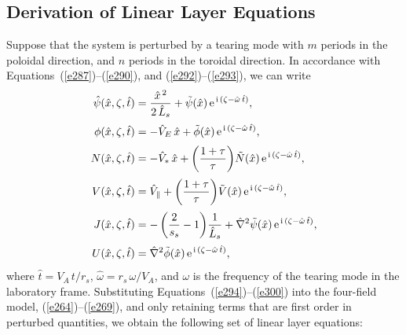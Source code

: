 \documentclass[notitlepage,12pt]{article}
\begin{document}
\subsection{Derivation of Linear Layer Equations}\label{s5.3}
Suppose that the system is perturbed by a tearing mode with $m$ periods in the poloidal direction, and
$n$ periods in the toroidal direction. In accordance with Equations~(\ref{e287})--(\ref{e290}), and (\ref{e292})--(\ref{e293}), we can write
\begin{align}\label{e295}
\hat{\psi}(\hat{x},\zeta,\hat{t}) &= \frac{\hat{x}^{\,2} }{2\,\hat{L}_s}+ \tilde{\psi}(\hat{x})\,{\rm e}^{\,{\rm i}\,(\zeta-\hat{\omega}\,\hat{t})},\\[0.5ex]
\phi(\hat{x},\zeta,\hat{t}) &=-\hat{V}_E\,\hat{x}+ \tilde{\phi}(\hat{x})\,{\rm e}^{\,{\rm i}\,(\zeta-\hat{\omega}\,\hat{t})},\\[0.5ex]
N(\hat{x},\zeta,\hat{t}) &= -\hat{V}_\ast\,\hat{x}+\left(\frac{1+\tau}{\tau}\right)\!\tilde{N}(\hat{x})\,{\rm e}^{\,{\rm i}\,(\zeta-\hat{\omega}\,\hat{t})},\\[0.5ex]
V(\hat{x},\zeta,\hat{t}) &= \hat{V}_\parallel + \left(\frac{1+\tau}{\tau}\right)\!\tilde{V}(\hat{x})\,{\rm e}^{\,{\rm i}\,(\zeta-\hat{\omega}\,\hat{t})},\\[0.5ex]
J(\hat{x},\zeta,\hat{t}) &=-\left(\frac{2}{s_s}-1\right)\!\frac{1}{\hat{L}_s}+ \hat{\nabla}^2\tilde{\psi}(\hat{x})\,{\rm e}^{\,{\rm i}\,(\zeta-\hat{\omega}\,\hat{t})},\\[0.5ex]
U(\hat{x},\zeta,\hat{t}) &=  \hat{\nabla}^2\tilde{\phi}(\hat{x})\,{\rm e}^{\,{\rm i}\,(\zeta-\hat{\omega}\,\hat{t})},\label{e300}
\end{align}
where $\hat{t}=V_A\,t/r_s$, $\hat{\omega}=r_s\,\omega/V_A$, and $\omega$ is the frequency of the tearing mode in the laboratory frame. 
Substituting Equations~(\ref{e294})--(\ref{e300}) into the four-field model, (\ref{e264})--(\ref{e269}), and only retaining terms that
are first order in perturbed quantities, we obtain the following set of linear layer equations:
\end{document}
